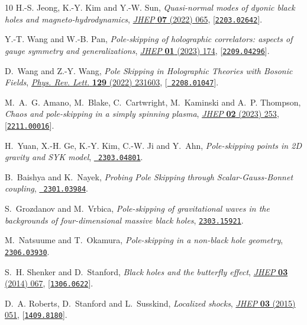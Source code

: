 \documentclass[11pt,a4paper]{article}
\begin{document}
\begin{thebibliography}{10}
H.-S. Jeong, K.-Y. Kim and Y.-W. Sun, \emph{{Quasi-normal modes of dyonic black
  holes and magneto-hydrodynamics}},
  \href{http://dx.doi.org/10.1007/JHEP07(2022)065}{\emph{JHEP} {\bf 07} (2022)
  065}, [\href{http://arxiv.org/abs/2203.02642}{{\tt 2203.02642}}].

Y.-T. Wang and W.-B. Pan, \emph{{Pole-skipping of holographic correlators:
  aspects of gauge symmetry and generalizations}},
  \href{http://dx.doi.org/10.1007/JHEP01(2023)174}{\emph{JHEP} {\bf 01} (2023)
  174}, [\href{http://arxiv.org/abs/2209.04296}{{\tt 2209.04296}}].

D.~Wang and Z.-Y. Wang, \emph{{Pole Skipping in Holographic Theories with
  Bosonic Fields}},
  \href{http://dx.doi.org/10.1103/PhysRevLett.129.231603}{\emph{Phys. Rev.
  Lett.} {\bf 129} (2022) 231603}, [\href{http://arxiv.org/abs/2208.01047}{{\tt
  2208.01047}}].

M.~A.~G. Amano, M.~Blake, C.~Cartwright, M.~Kaminski and A.~P. Thompson,
  \emph{{Chaos and pole-skipping in a simply spinning plasma}},
  \href{http://dx.doi.org/10.1007/JHEP02(2023)253}{\emph{JHEP} {\bf 02} (2023)
  253}, [\href{http://arxiv.org/abs/2211.00016}{{\tt 2211.00016}}].

H.~Yuan, X.-H. Ge, K.-Y. Kim, C.-W. Ji and Y.~Ahn, \emph{{Pole-skipping points
  in 2D gravity and SYK model}},  \href{http://arxiv.org/abs/2303.04801}{{\tt
  2303.04801}}.

B.~Baishya and K.~Nayek, \emph{{Probing Pole Skipping through
  Scalar-Gauss-Bonnet coupling}},  \href{http://arxiv.org/abs/2301.03984}{{\tt
  2301.03984}}.

S.~Grozdanov and M.~Vrbica, \emph{{Pole-skipping of gravitational waves in the
  backgrounds of four-dimensional massive black holes}},
  \href{http://arxiv.org/abs/2303.15921}{{\tt 2303.15921}}.

M.~Natsuume and T.~Okamura, \emph{{Pole-skipping in a non-black hole
  geometry}},  \href{http://arxiv.org/abs/2306.03930}{{\tt 2306.03930}}.

S.~H. Shenker and D.~Stanford, \emph{{Black holes and the butterfly effect}},
  \href{http://dx.doi.org/10.1007/JHEP03(2014)067}{\emph{JHEP} {\bf 03} (2014)
  067}, [\href{http://arxiv.org/abs/1306.0622}{{\tt 1306.0622}}].

D.~A. Roberts, D.~Stanford and L.~Susskind, \emph{{Localized shocks}},
  \href{http://dx.doi.org/10.1007/JHEP03(2015)051}{\emph{JHEP} {\bf 03} (2015)
  051}, [\href{http://arxiv.org/abs/1409.8180}{{\tt 1409.8180}}].


\end{thebibliography}
\end{document}
